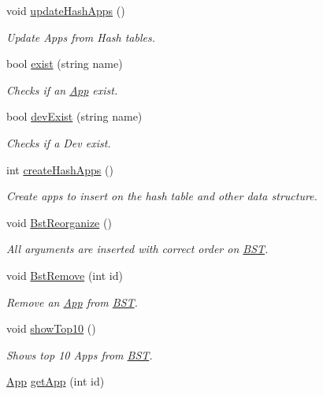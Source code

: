 \begin{DoxyCompactItemize}
void \hyperlink{class_app_store_aec000285f1094e63b86a3d6753016d41}{update\-Hash\-Apps} ()
\begin{DoxyCompactList}\small\item\em Update Apps from Hash tables. \end{DoxyCompactList}\item 
bool \hyperlink{class_app_store_a8a1192683d74e8f4c9611adc6e0ca664}{exist} (string name)
\begin{DoxyCompactList}\small\item\em Checks if an \hyperlink{class_app}{App} exist. \end{DoxyCompactList}\item 
bool \hyperlink{class_app_store_a3f9e2b8cd4f0654cdb176250ee827b93}{dev\-Exist} (string name)
\begin{DoxyCompactList}\small\item\em Checks if a Dev exist. \end{DoxyCompactList}\item 
int \hyperlink{class_app_store_abbe21a1e0ad0bbeee3bdd0a280c1b72e}{create\-Hash\-Apps} ()
\begin{DoxyCompactList}\small\item\em Create apps to insert on the hash table and other data structure. \end{DoxyCompactList}\item 
void \hyperlink{class_app_store_a273c4ffa66b4b11ca90aaa392b08efb6}{Bst\-Reorganize} ()
\begin{DoxyCompactList}\small\item\em All arguments are inserted with correct order on \hyperlink{class_b_s_t}{B\-S\-T}. \end{DoxyCompactList}\item 
void \hyperlink{class_app_store_ad426df493048edf5d564a7a34cf38247}{Bst\-Remove} (int id)
\begin{DoxyCompactList}\small\item\em Remove an \hyperlink{class_app}{App} from \hyperlink{class_b_s_t}{B\-S\-T}. \end{DoxyCompactList}\item 
void \hyperlink{class_app_store_a4188dc3c042576ef220d7d26c0f55a35}{show\-Top10} ()
\begin{DoxyCompactList}\small\item\em Shows top 10 Apps from \hyperlink{class_b_s_t}{B\-S\-T}. \end{DoxyCompactList}\item 
\hyperlink{class_app}{App} \hyperlink{class_app_store_a39196e235f6f3c22808489d5ef1d516d}{get\-App} (int id)

\end{DoxyCompactItemize}
